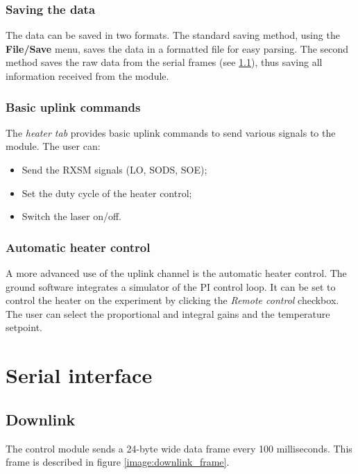 \documentclass[11pt,a4paper,oneside]{report}
\begin{document}
\subsection{Saving the data}

The data can be saved in two formats. The standard saving method, using the \textbf{File/Save} menu, saves the data in a formatted file for easy parsing. The second method saves the raw data from the serial frames (see \ref{section:downlink}), thus saving all information received from the module.

\subsection{Basic uplink commands}

The \emph{heater tab} provides basic uplink commands to send various signals to the module.
The user can:

\begin{itemize}
\item Send the RXSM signals (LO, SODS, SOE);
\item Set the duty cycle of the heater control;
\item Switch the laser on/off.
\end{itemize}

\subsection{Automatic heater control}

A more advanced use of the uplink channel is the automatic heater control.
The ground software integrates a simulator of the PI control loop.
It can be set to control the heater on the experiment by clicking the \emph{Remote control} checkbox.
The user can select the proportional and integral gains and the temperature setpoint.

\chapter{Serial interface}

\section{Downlink}
\label{section:downlink}

The control module sends a 24-byte wide data frame every 100 milliseconds.
This frame is described in figure \ref{image:downlink_frame}.
\end{document}
